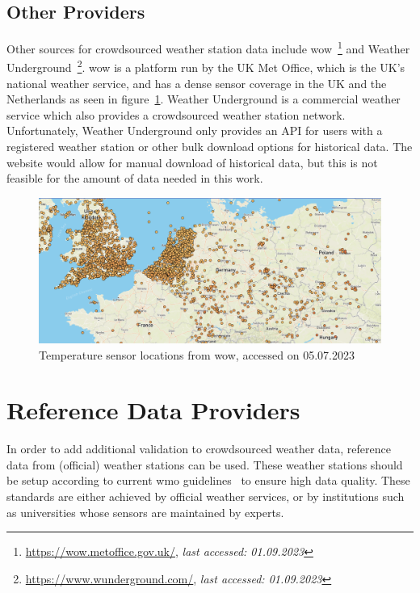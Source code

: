 \subsection{Other Providers}

Other sources for crowdsourced weather station data include \gls{wow}~\footnote{\url{https://wow.metoffice.gov.uk/}, \textit{last accessed: 01.09.2023}} and Weather Underground~\footnote{\url{https://www.wunderground.com/}, \textit{last accessed: 01.09.2023}}.
\gls{wow} is a platform run by the UK Met Office, which is the UK's national weather service, and has a dense sensor coverage in the UK and the Netherlands as seen in figure~\ref{fig:wow sensor locations}.
Weather Underground is a commercial weather service which also provides a crowdsourced weather station network. Unfortunately, Weather Underground only provides an API for users with a registered weather station or other bulk download options for historical data. The website would allow for manual download of historical data, but this is not feasible for the amount of data needed in this work.

\begin{figure}[ht]
    \centering
    \includegraphics[width=1\textwidth]{images/wow_sensor_locations.png}
    \caption{Temperature sensor locations from \gls{wow}, accessed on 05.07.2023}
    \label{fig:wow sensor locations}
\end{figure}

\section{Reference Data Providers}

In order to add additional validation to crowdsourced weather data, reference data from (official) weather stations can be used. These weather stations should be setup according to current \gls{wmo} guidelines~\cite{wmo2018guide} to ensure high data quality. These standards are either achieved by official weather services, or by institutions such as universities whose sensors are maintained by experts.

